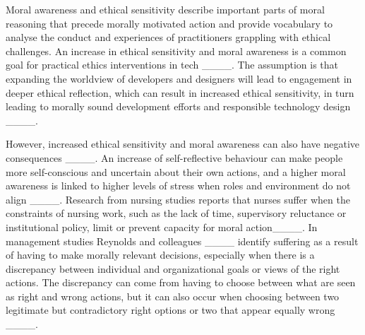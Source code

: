 Moral awareness and ethical sensitivity describe important parts of moral reasoning that precede morally motivated action and provide vocabulary to analyse the conduct and experiences of practitioners grappling with ethical challenges. An increase in ethical sensitivity and moral awareness is a common goal for practical ethics interventions in tech ____. The assumption is that expanding the worldview of developers and designers will lead to engagement in deeper ethical reflection, which can result in increased ethical sensitivity, in turn leading to morally sound development efforts and responsible technology design ____.

However, increased ethical sensitivity and moral awareness can also have negative consequences ____. An increase of self-reflective behaviour can make people more self-conscious and uncertain about their own actions, and a higher moral awareness is linked to higher levels of stress when roles and environment do not align ____. Research from nursing studies reports that nurses suffer when the constraints of nursing work, such as the lack of time, supervisory reluctance or institutional policy, limit or prevent capacity for moral action____. In management studies Reynolds and colleagues ____ identify suffering as a result of having to make morally relevant decisions, especially when there is a discrepancy between individual and organizational goals or views of the right actions. The discrepancy can come from having to choose between what are seen as right and wrong actions, but it can also occur when choosing between two legitimate but contradictory right options or two that appear equally wrong ____.  

